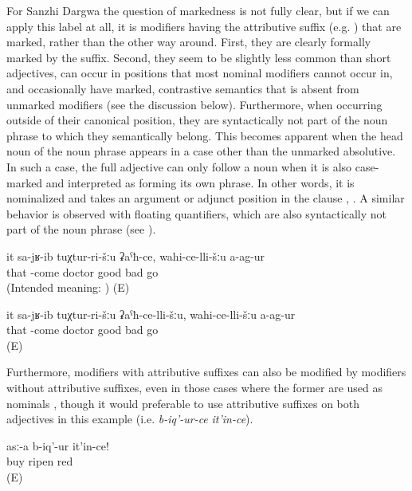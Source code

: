 For Sanzhi Dargwa the question of markedness is not fully clear, but if we can apply this label at all, it is modifiers having the attributive suffix (e.g. ) that are marked, rather than the other way around. First, they are clearly formally marked by the suffix. Second, they seem to be slightly less common than short adjectives, can occur in positions that most nominal modifiers cannot occur in, and occasionally have marked, contrastive semantics that is absent from unmarked modifiers (see the discussion below). Furthermore, when occurring outside of their canonical position, they are syntactically not part of the noun phrase to which they semantically belong. This becomes apparent when the head noun of the noun phrase appears in a case other than the unmarked absolutive. In such a case, the full adjective can only follow a noun when it is also case-marked and interpreted as forming its own phrase. In other words, it is nominalized and takes an argument or adjunct position in the clause , . A similar behavior is observed with floating quantifiers, which are also syntactically not part of the noun phrase (see ).
%
\begin{exe}
	\ex	\label{ex:He went to a good doctor, he did not go to a bad one ungrammatical minor}
	\gll	{*}	it	sa-jʁ-ib	tuχtur-ri-šːu ʡaˁħ-ce,	wahi-ce-lli-šːu	a-ag-ur\\
		{}	that	-come	doctor good	bad	go\\
	\glt	(Intended meaning: ) (E)

	\ex	\label{ex:He went to a doctor who is good; he did not go to a bad one minor}
	\gll	it	sa-jʁ-ib	tuχtur-ri-šːu ʡaˁħ-ce-lli-šːu,	wahi-ce-lli-šːu	a-ag-ur\\
		that	-come	doctor good	bad	go\\
	\glt	{} (E)
\end{exe}

Furthermore, modifiers with attributive suffixes can also be modified by modifiers without attributive suffixes, even in those cases where the former are used as nominals , though it would preferable to use attributive suffixes on both adjectives in this example (i.e. \textit{b-iq'-ur-ce}	\textit{it'in-ce}).
%
\begin{exe}
	\ex	\label{ex:Buy a ripe red one minor}
	\gll	asː-a	b-iq'-ur	it'in-ce!\\
		buy	ripen	red\\
	\glt	{} (E)
\end{exe}

